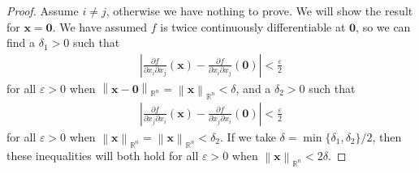 \documentclass{article}
\newcommand{\R}{\mathbb{R}}
\newcommand{\x}{\mathbf{x}}
\newcommand{\ze}{\mathbf{0}}
\newcommand{\norm}[1]{\left\lVert#1\right\rVert}
\newcommand{\abs}[1]{\left\lvert#1\right\rvert}
\theoremstyle{definition}
\begin{document}
	\begin{proof}
		Assume $ i\neq j $, otherwise we have nothing to prove. We will show the result for $ \x = \ze $. We have assumed $ f $ is twice continuously differentiable at $ \ze $, so we can find a $ \delta_1 > 0 $ such that 
		\begin{align}
			\abs{\frac{\partial f}{\partial x_i\partial x_j}(\x) - \frac{\partial f}{\partial x_i\partial x_j}(\ze)}<\frac{ \varepsilon}{2}
		\end{align}
		for all $ \varepsilon >0 $ when $ \norm{\x - \ze}_{\R^n} = \norm{\x}_{\R^n} <\delta $, and a $ \delta_2 > 0 $ such that 
		\begin{align}
			\abs{\frac{\partial f}{\partial x_j\partial x_i}(\x) - \frac{\partial f}{\partial x_j\partial x_i}(\ze)}< \frac{ \varepsilon}{2}
		\end{align}
		for all $ \varepsilon >0$  when $ \norm{\x}_{\R^n} = \norm{\x}_{\R^n}<\delta _2 $. If we take $ \delta = \min\{\delta_1,\delta_2\}/2 $, then these inequalities will both hold for all $ \varepsilon >0$  when $ \norm{\x}_{\R^n} < 2\delta $. 
		

\end{proof}
\end{document}
